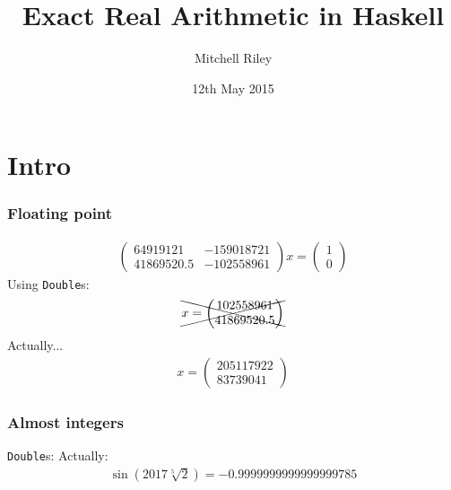 \documentclass[11pt]{beamer}
\author{Mitchell Riley}
\title{Exact Real Arithmetic in Haskell}
\date{12th May 2015}
\begin{document}
\begin{frame}
\titlepage
\end{frame}

\section{Intro}

\begin{frame}
\frametitle{Floating point}
\begin{align*}
\begin{pmatrix}
64919121   & -159018721 \\
41869520.5 & -102558961
\end{pmatrix} x =
\begin{pmatrix}
1 \\
0
\end{pmatrix}
\end{align*}
\pause
Using \texttt{Double}s:
\pause
\begin{align*}
\xcancel{x =
\begin{pmatrix}
102558961 \\
41869520.5
\end{pmatrix}}
\end{align*}
\pause
Actually...
\begin{align*}
x =
\begin{pmatrix}
205117922 \\
83739041
\end{pmatrix}
\end{align*}
\end{frame}


\begin{frame}
\frametitle{Almost integers}
\texttt{Double}s:
\pause
Actually:
\begin{align*}
\sin(2017 \sqrt[5]{2}) = -0.9999999999999999785
\end{align*}
\end{frame}
\end{document}
